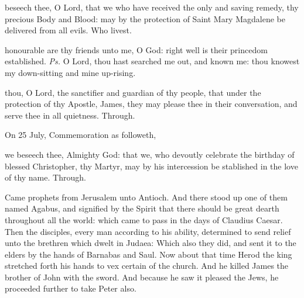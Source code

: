 \postcommunion
{} beseech thee, O Lord, that we who have received the only and saving remedy, thy precious Body and Blood: may by the protection of Saint Mary Magdalene be delivered from all evils. Who livest.



\introit
{} honourable are thy friends unto me, O God: right well is their princedom established. \textit{Ps.} O Lord, thou hast searched me out, and known me: thou knowest my down-sitting and mine up-rising.

\collect
 thou, O Lord, the sanctifier and guardian of thy people, that under the protection of thy Apostle, James, they may please thee in their conversation, and serve thee in all quietness. Through.
\begin{rubric}
	 On 25 July, Commemoration  as followeth,
\end{rubric}
 we beseech thee, Almighty God: that we, who devoutly celebrate the birthday of blessed Christopher, thy Martyr, may by his intercession be stablished in the love of thy name. Through.

 Came prophets from Jerusalem unto Antioch. And there stood up one of them named Agabus, and signified by the Spirit that there should be great dearth throughout all the world: which came to pass in the days of Claudius Caesar. Then the disciples, every man according to his ability, determined to send relief unto the brethren which dwelt in Judaea: Which also they did, and sent it to the elders by the hands of Barnabas and Saul. Now about that time Herod the king stretched forth his hands to vex certain of the church. And he killed James the brother of John with the sword. And because he saw it pleased the Jews, he proceeded further to take Peter also.

